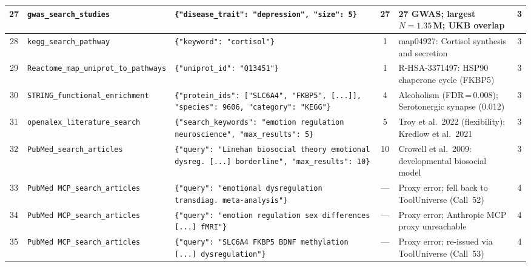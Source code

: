 {\begin{longtable}{@{}c p{2.2cm} p{4.5cm} c p{4cm} c@{}}
27 &
\texttt{gwas\_search\_\allowbreak studies} &
\texttt{\{"disease\_trait": "depression", "size": 5\}} &
27 &
27 GWAS; largest $N{=}1.35$\,M; UKB overlap &
3 \\
\midrule

28 &
\texttt{kegg\_search\_\allowbreak pathway} &
\texttt{\{"keyword": "cortisol"\}} &
1 &
map04927: Cortisol synthesis and secretion &
3 \\
\midrule

29 &
\texttt{Reactome\_map\_\allowbreak uniprot\_to\_\allowbreak pathways} &
\texttt{\{"uniprot\_id": "Q13451"\}} &
1 &
R-HSA-3371497: HSP90 chaperone cycle (FKBP5) &
3 \\
\midrule

30 &
\texttt{STRING\_\allowbreak functional\_\allowbreak enrichment} &
\texttt{\{"protein\_ids": ["SLC6A4", "FKBP5", [...]], "species": 9606, "category": "KEGG"\}} &
4 &
Alcoholism (FDR\,=\,0.008); Serotonergic synapse (0.012) &
3 \\
\midrule

31 &
\texttt{openalex\_\allowbreak literature\_\allowbreak search} &
\texttt{\{"search\_keywords": "emotion regulation neuroscience", "max\_results": 5\}} &
5 &
Troy et al.\ 2022 (flexibility); Kredlow et al.\ 2021 &
3 \\
\midrule

32 &
\texttt{PubMed\_search\_\allowbreak articles} &
\texttt{\{"query": "Linehan biosocial theory emotional dysreg.\ [...] borderline", "max\_results": 10\}} &
10 &
Crowell et al.\ 2009: developmental biosocial model &
3 \\
\midrule


33 &
\texttt{PubMed MCP\_\allowbreak search\_\allowbreak articles} &
\texttt{\{"query": "emotional dysregulation transdiag.\ meta-analysis"\}} &
--- &
Proxy error; fell back to ToolUniverse (Call~52) &
4 \\
\midrule

34 &
\texttt{PubMed MCP\_\allowbreak search\_\allowbreak articles} &
\texttt{\{"query": "emotion regulation sex differences [...] fMRI"\}} &
--- &
Proxy error; Anthropic MCP proxy unreachable &
4 \\
\midrule

35 &
\texttt{PubMed MCP\_\allowbreak search\_\allowbreak articles} &
\texttt{\{"query": "SLC6A4 FKBP5 BDNF methylation [...] dysregulation"\}} &
--- &
Proxy error; re-issued via ToolUniverse (Call~53) &
4 \\
\midrule


\end{longtable}}
